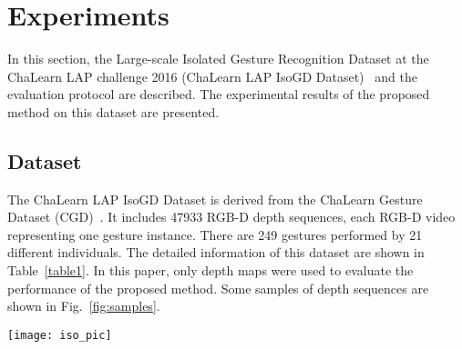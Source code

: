 \documentclass[10pt, a4paper, conference]{IEEEtran}
\begin{document}
\section{Experiments}
In this section, the Large-scale Isolated Gesture Recognition Dataset at the ChaLearn LAP challenge 2016 (ChaLearn LAP IsoGD Dataset)~\cite{ICPRW2016} and the evaluation protocol are described. The experimental results of the proposed method on this dataset are presented.

\subsection{Dataset}
The ChaLearn LAP IsoGD Dataset is derived from the ChaLearn Gesture Dataset (CGD)~\cite{guyon2014chalearn}. It includes 47933 RGB-D depth sequences, each RGB-D video representing one gesture instance. There are 249 gestures performed by 21 different individuals.  The detailed information of this dataset are shown in Table~\ref{table1}.  In this paper, only depth maps were used to evaluate the performance of the proposed method. Some samples of depth sequences are shown in Fig.~\ref{fig:samples}.


\begin{figure*}[t]
\begin{center}{\texttt{[image: iso\_pic]}}
\end{center}
\caption{The samples of 21 out of 249 gestures. From top left to bottom right, they are: \\(a) ItalianGestures/Madonna; (b) GestunoTopography/92\_harbour\_port; (c) TaxiSouthAfrica/TaxiHandSigns2;\\ (d) GestunoSmallAnimals/129\_cat\_chat;(e) RefereeWrestlingSignals2/Reversal; (f) DivingSignals3/NotUnderstood;\\(g) SurgeonSignals/ArmyNavyRetractor; (h) GangHandSignals1/EastSide; (i) SwatHandSignals1/DogNeeded;\\(j) HelicopterSignals/MoveLeft; (k) GangHandSignals2/Killas; (l) TaxiSouthAfrica/TaxiHandSigns6;\\ (m) DivingSignals4/HowMuchAir; (n) ChineseNumbers/wu,TaxiSouthAfrica/TaxiHandSigns7;\\ (o) Mudra2/Vitarka,DivingSignals4/OK,GangHandSignals2/OK; (p) DivingSignals1/Around;\\(q) CanadaAviationGroundCirculation1/DirigezVousVers; (r) MusicNotes/do; (s) GangHandSignals1/Crip;\\ (t) SwatHandSignals1/Stop; (u) RefereeWrestlingSignals2/Stalling,SwatHandSignals1/Breacher.}
\label{fig:samples}
\end{figure*}
\end{document}
